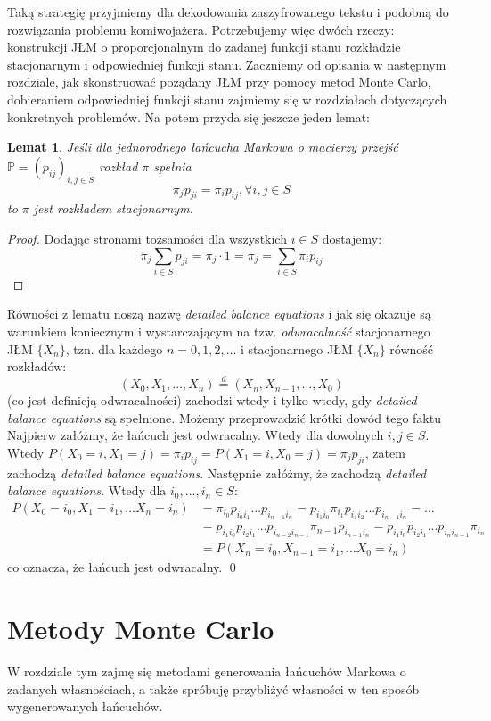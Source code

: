 \documentclass[a4paper]{article}
\theoremstyle{defn}
\theoremstyle{theorem}
\theoremstyle{lemma}
\newtheorem{lemma}[defn]{Lemat}
\theoremstyle{cor}
\theoremstyle{fact}
\begin{document}
Taką strategię przyjmiemy dla dekodowania zaszyfrowanego tekstu i podobną do rozwiązania problemu komiwojażera.
Potrzebujemy więc dwóch rzeczy: konstrukcji JŁM o proporcjonalnym do zadanej funkcji stanu rozkładzie stacjonarnym i odpowiedniej funkcji stanu. Zaczniemy od opisania w następnym rozdziale, jak skonstruować pożądany JŁM przy pomocy metod Monte Carlo, dobieraniem odpowiedniej funkcji stanu zajmiemy się w rozdziałach dotyczących konkretnych problemów. Na potem przyda się jeszcze jeden lemat:
\begin{lemma}\label{lemma2.7.1}
Jeśli dla jednorodnego łańcucha Markowa o macierzy przejść $\mathbb{P} = (p_{ij})_{i, j \in S}$ rozkład $\pi$ spełnia $$\pi_j p_{ji} = \pi_i p_{ij},  \forall i,j \in S$$ to $\pi$ jest rozkładem stacjonarnym.
\end{lemma}
\begin{proof} Dodając stronami  tożsamości dla wszystkich $i \in S$ dostajemy:
$$\pi_j \sum\limits_{i \in S} p_{ji} = \pi_j \cdot 1 = \pi_j = \sum\limits_{i \in S} \pi_i p_{ij}$$
\end{proof}
Równości z lematu noszą nazwę \textit{detailed balance equations} i jak się okazuje są warunkiem koniecznym i wystarczającym na tzw. \textit{odwracalność} stacjonarnego JŁM $\{X_n\}$, tzn. dla każdego $n = 0,1,2,...$ i stacjonarnego JŁM $\{X_n\}$ równość rozkładów:
$$(X_0, X_1, ..., X_n) \overset{d}{=} (X_n, X_{n-1}, ..., X_0)$$
(co jest definicją odwracalności) zachodzi wtedy i tylko wtedy, gdy \textit{detailed balance equations} są spełnione.
Możemy przeprowadzić krótki dowód tego faktu
Najpierw załóżmy, że łańcuch jest odwracalny. Wtedy dla dowolnych $i,j \in S$. Wtedy $P(X_0 = i, X_1 = j) = \pi_i p_{ij} = P(X_1 = i, X_0 = j) = \pi_j p_{ji}$, zatem zachodzą \textit{detailed balance equations}. Następnie załóżmy, że zachodzą \textit{detailed balance equations}. Wtedy dla $i_0, ..., i_n \in S$:
\begin{align*}
P(X_0 = i_0, X_1 = i_1, ... X_n = i_n) &= \pi_{i_0} p_{i_0 i_1} ... p_{i_{n-1} i_n} =
p_{i_1 i_0} \pi_{i_1}  p_{i_1 i_2} ... p_{i_{n-1} i_n} = ... \\ &=p_{i_1 i_0} p_{i_2 i_1} ... p_{i_{n-2} i_{n-1}} \pi_{n-1} p_{i_{n-1} i_n} = p_{i_1 i_0} p_{i_2 i_1} ... p_{i_{n} i_{n-1}} \pi_{i_n} \\
&=P(X_n = i_0, X_{n-1} = i_1, ... X_0 = i_n)
\end{align*}
co oznacza, że łańcuch jest odwracalny. \qed
\newpage
\section{Metody Monte Carlo}
W rozdziale tym zajmę się metodami generowania łańcuchów Markowa o zadanych własnościach, a także spróbuję przybliżyć własności w ten sposób wygenerowanych łańcuchów.
\\
\end{document}
